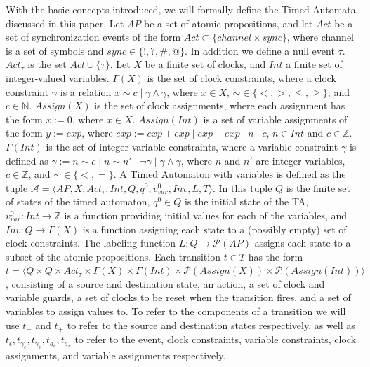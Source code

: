 \documentclass[a4paper,11pt]{report}
\newcommand*\BitOr{\mathbin{|}}
\theoremstyle{definition}
\begin{document}
With the basic concepts introduced, we will formally define the Timed Automata
discussed in this paper. Let \(AP\) be a set of atomic propositions, and let \(Act\) be a set of
synchronization events of the form $Act \subset \{channel \times sync\}$,
where channel is a set of symbols and $sync \in \{!,?,\#,@\}$. In addition we
define a null event \(\tau\). \(Act_{\tau}\) is the set \(Act \cup \{\tau\}\).
Let \(X\) be a finite set of clocks, and \(Int\) a finite set of integer-valued
variables. \(\Gamma(X)\) is the set of clock constraints, where a clock
constraint \(\gamma\) is a relation
\(x \sim c \BitOr \gamma \land \gamma\), where \(x \in X\),
\(\sim \in \{<,>,\leq,\geq\}\), and \(c \in \mathbb{N}\). \(Assign(X)\) is the set of
clock assignments, where each assignment has the form \(x := 0\), where
\(x \in X\iffalse{,\ c {\in} \mathbb{Z}^+}\fi\). \(Assign(Int)\) is a set of
variable assignments of the form \(y := exp\), where
\(exp := exp + exp\BitOr exp - exp\BitOr n\BitOr c\),
\(n \in Int\) and \(c \in \mathbb{Z}\). \(\Gamma(Int)\) is the set of integer
variable constraints, where a variable constraint \(\gamma\) is defined as
\(\gamma := n \sim c\BitOr n \sim n'\BitOr \neg \gamma\BitOr \gamma \land \gamma\),
where \(n\) and \(n'\) are integer variables, \(c \in \mathbb{Z}\), and
\(\sim \in \{<,=\}\). A Timed Automaton with variables is defined as the tuple
\(\mathcal{A} = \big \langle AP,X, Act_{\tau}, Int, Q, q^0, v_{var}^0, Inv, L, T \big \rangle\).
In this tuple \(Q\) is the finite set of states of the timed automaton,
\(q^0 \in Q\) is the initial state of the TA,
\(v_{var}^{0} : Int \rightarrow \mathbb{Z}\) is a function providing initial
values for each of the variables, and \(Inv : Q \rightarrow \Gamma(X)\) is a
function assigning each state to a (possibly empty) set of clock constraints.
The labeling function \(L: Q \rightarrow \mathcal{P}(AP)\) assigns each state to
a subset of the atomic propositions. Each transition \(t \in T\) has the form
\(t = \big \langle Q \times Q \times Act_{\tau} \times \Gamma(X) \times \Gamma(Int) \times \mathcal{P}(Assign(X)) \times \mathcal{P}(Assign(Int)) \big \rangle \),
consisting of a source and destination state, an action, a set of clock and
variable guards, a set of clocks to be reset when the transition fires, and a
set of variables to assign values to. To refer to the components of a transition
we will use \(t_-\) and \(t_+\) to refer to the source and destination states
respectively, as well as
\(t_\epsilon, t_{\gamma_c}, t_{\gamma_v}, t_{a_c}, t_{a_v}\) to refer to the
event, clock constraints, variable constraints, clock assignments, and variable
assignments respectively.
\end{document}
